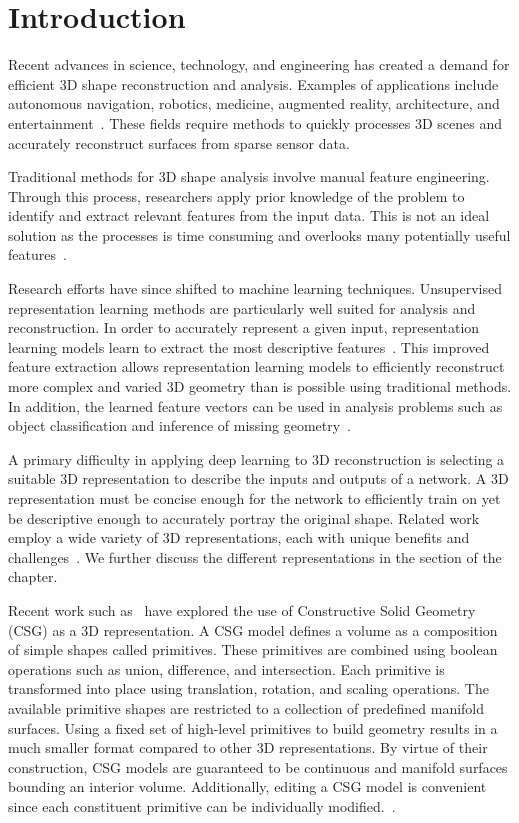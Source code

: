 
\chapter{Introduction}
\label{chap:introduction}

Recent advances in science, technology, and engineering has created a demand for efficient 3D shape reconstruction and analysis. Examples of applications include autonomous navigation, robotics, medicine, augmented reality, architecture, and entertainment~\cite{Xiao2020, Xie2022}. These fields require methods to quickly processes 3D scenes and accurately reconstruct surfaces from sparse sensor data.

Traditional methods for 3D shape analysis involve manual feature engineering. Through this process, researchers apply prior knowledge of the problem to identify and extract relevant features from the input data. This is not an ideal solution as the processes is time consuming and overlooks many potentially useful features~\cite{Bengio2013}.

Research efforts have since shifted to machine learning techniques. Unsupervised representation learning methods are particularly well suited for analysis and reconstruction. In order to accurately represent a given input, representation learning models learn to extract the most descriptive features~\cite{Bengio2013}. This improved feature extraction allows representation learning models to efficiently reconstruct more complex and varied 3D geometry than is possible using traditional methods. In addition, the learned feature vectors can be used in analysis problems such as object classification and inference of missing geometry~\cite{Park2019}.

A primary difficulty in applying deep learning to 3D reconstruction is selecting a suitable 3D representation to describe the inputs and outputs of a network. A 3D representation must be concise enough for the network to efficiently train on yet be descriptive enough to accurately portray the original shape. Related work employ a wide variety of 3D representations, each with unique benefits and challenges~\cite{Xiao2020}. We further discuss the different representations in the  section of the  chapter.

Recent work such as~\cite{Sharma2018, Kania2020, Ren2021} have explored the use of Constructive Solid Geometry (CSG) as a 3D representation. A CSG model defines a volume as a composition of simple shapes called primitives. These primitives are combined using boolean operations such as union, difference, and intersection. Each primitive is transformed into place using translation, rotation, and scaling operations. The available primitive shapes are restricted to a collection of predefined manifold surfaces. Using a fixed set of high-level primitives to build geometry results in a much smaller format compared to other 3D representations. By virtue of their construction, CSG models are guaranteed to be continuous and manifold surfaces bounding an interior volume. Additionally, editing a CSG model is convenient since each constituent primitive can be individually modified.~\cite{Hughes2013}.

